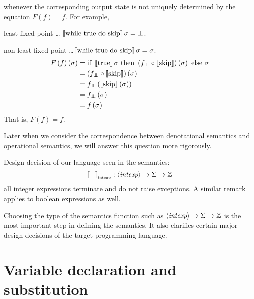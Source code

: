 \begin{enumcirc}
	whenever the corresponding output state is not uniquely determined by the
	equation $F(f) = f$.
	For example,
	\begin{enumrm}
		\item
		least fixed point \dots
		$\left\llbracket \textrm{while } \textrm{true} \textrm{ do } \textrm{skip} \right\rrbracket \sigma = \bot$.
		\item
		non-least fixed point
		\dots $\left\llbracket \textrm{while } \textrm{true} \textrm{ do } \textrm{skip} \right\rrbracket \sigma = \sigma$.
		\begin{align*}
			F\prths{f}\prths{\sigma} & = \cif{\bbrackets{\textrm{true}} \sigma}{\prths{f_\doublebot \circ \bbrackets{\cskip}} \prths{\sigma}}{\sigma} \\
			                         & = \prths{f_\doublebot \circ \bbrackets{\cskip}} \prths{\sigma}                                                 \\
			                         & = f_\doublebot \prths{\bbrackets{\cskip} \prths{\sigma}}                                                       \\
			                         & = f_\doublebot \prths{\sigma}                                                                                  \\
			                         & = f\prths{\sigma}                                                                                              \\
		\end{align*}
		That is, $F(f) = f$.
	\end{enumrm}
	Later when we consider the correspondence between denotational semantics and
	operational semantics, we will answer this question more rigorously.
	\item
	Design decision of our language seen in the semantics:
	\[
		\left\llbracket - \right\rrbracket_{\textrm{\tiny intexp}} : \left\langle \textit{intexp} \right\rangle \to \Sigma \to \mathbb{Z}
	\]
	all integer expressions terminate and do not raise exceptions.
	A similar remark applies to boolean expressions as well.
	\item
	Choosing the type of the semantics function such as
	$\left\langle \textit{intexp} \right\rangle \to \Sigma \to \mathbb{Z}$
	is the most important step in defining the semantics.
	It also clarifies certain major design decisions of the target programming
	language.
\end{enumcirc}

\section{Variable declaration and substitution}

